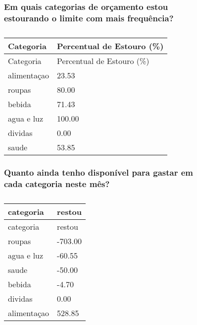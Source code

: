 \documentclass[
  8pt,
  a4paper,
  DIV=11,
  numbers=noendperiod]{scrartcl}
\begin{document}
\begin{figure}

\begin{minipage}{0.50\linewidth}

\subsubsection{Em quais categorias de orçamento estou estourando o
limite com mais
frequência?}\label{em-quais-categorias-de-oruxe7amento-estou-estourando-o-limite-com-mais-frequuxeancia}

\begin{longtable}[]{@{}ll@{}}
\caption{}\label{T_baf3d}\tabularnewline
\toprule\noalign{}
Categoria & Percentual de Estouro (\%) \\
\midrule\noalign{}
\endfirsthead
\toprule\noalign{}
Categoria & Percentual de Estouro (\%) \\
\midrule\noalign{}
\endhead
\bottomrule\noalign{}
\endlastfoot
alimentaçao & 23.53 \\
roupas & 80.00 \\
bebida & 71.43 \\
agua e luz & 100.00 \\
dividas & 0.00 \\
saude & 53.85 \\
\end{longtable}

\end{minipage}%
%
\begin{minipage}{0.50\linewidth}

\subsubsection{Quanto ainda tenho disponível para gastar em cada
categoria neste
mês?}\label{quanto-ainda-tenho-disponuxedvel-para-gastar-em-cada-categoria-neste-muxeas}

\begin{longtable}[]{@{}ll@{}}
\caption{}\label{T_b32ee}\tabularnewline
\toprule\noalign{}
categoria & restou \\
\midrule\noalign{}
\endfirsthead
\toprule\noalign{}
categoria & restou \\
\midrule\noalign{}
\endhead
\bottomrule\noalign{}
\endlastfoot
roupas & -703.00 \\
agua e luz & -60.55 \\
saude & -50.00 \\
bebida & -4.70 \\
dividas & 0.00 \\
alimentaçao & 528.85 \\
\end{longtable}

\end{minipage}%

\end{figure}%
\end{document}
